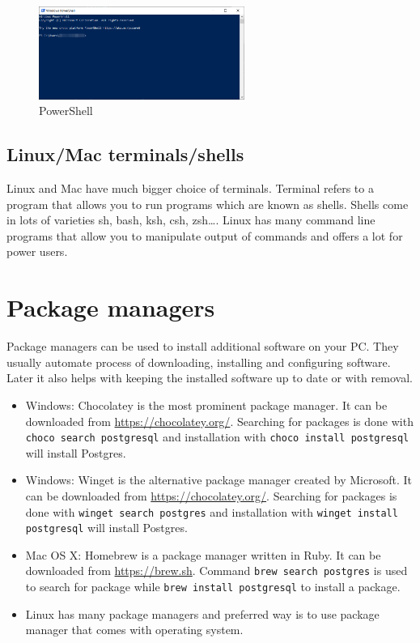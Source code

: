 \begin{figure}[htbp]
    \centering
    \includegraphics[width=0.6\textwidth]{images/powershell}
    \caption{PowerShell\label{fig:PowerShell}}
\end{figure}

\subsection{Linux/Mac terminals/shells}\label{subsec:linux/mac-terminals/shells}

Linux and Mac have much bigger choice of terminals.
Terminal refers to a program that allows you to run programs which are known as shells.
Shells come in lots of varieties sh, bash, ksh, csh, zsh\dots.
Linux has many command line programs that allow you to manipulate output of commands and offers a lot for power users.


\section{Package managers}\label{sec:package-managers}

Package managers can be used to install additional software on your PC. They usually automate process of
downloading, installing and configuring software.
Later it also helps with keeping the installed software up to date or with removal.

\begin{itemize}[leftmargin=*]
    \item Windows: Chocolatey is the most prominent package manager.
    It can be downloaded from \href{https://chocolatey.org/}{https://chocolatey.org/}.
    Searching for packages is done with \texttt{choco search postgresql}
    and installation with \texttt{choco install postgresql} will install Postgres.
    \item Windows: Winget is the alternative package manager created by Microsoft.
    It can be downloaded from \href{https://chocolatey.org/}{https://chocolatey.org/}.
    Searching for packages is done with \texttt{winget search postgres}
    and installation with \texttt{winget install postgresql} will install Postgres.
    \item Mac OS X: Homebrew is a package manager written in Ruby.
          It can be downloaded from \href{https://brew.sh}{https://brew.sh}.
          Command \texttt{brew search postgres}
          is used to search for package while \texttt{brew install postgresql} to install a package.
    \item Linux has many package managers and preferred way is to use package manager
          that comes with operating system.
\end{itemize}